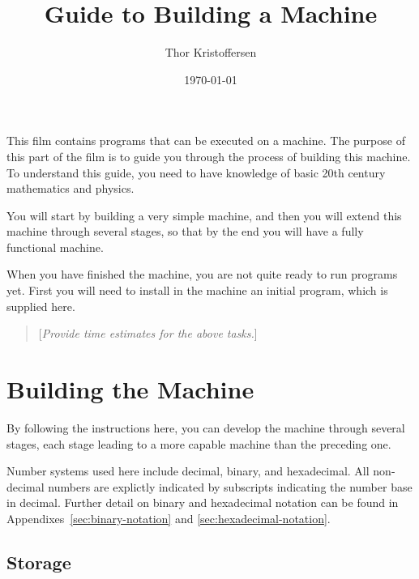 \documentclass[a4paper,11pt]{article}
\author{Thor Kristoffersen}
\date{\today}
\title{Guide to Building a Machine}
\newcommand{\comment}[1]{\begin{quote}[\textit{#1}]\end{quote}}
\begin{document}
\maketitle

\noindent
This film contains programs that can be executed on a machine.
The purpose of this part of the film is to guide you through the process of building this machine.
To understand this guide, you need to have knowledge of basic 20th century mathematics and physics.

You will start by building a very simple machine, and then you will extend this machine through several stages, so that by the end you will have a fully functional machine.

When you have finished the machine, you are not quite ready to run programs yet.
First you will need to install in the machine an initial program, which is supplied here.

\comment{Provide time estimates for the above tasks.}

\section{Building the Machine}
\label{sec:building-machine}

By following the instructions here, you can develop the machine through several stages, each stage leading to a more capable machine than the preceding one.

Number systems used here include decimal, binary, and hexadecimal.
All non-decimal numbers are explictly indicated by subscripts indicating the number base in decimal.
Further detail on binary and hexadecimal notation can be found in Appendixes~\ref{sec:binary-notation} and \ref{sec:hexadecimal-notation}.

\subsection{Storage}
\end{document}
